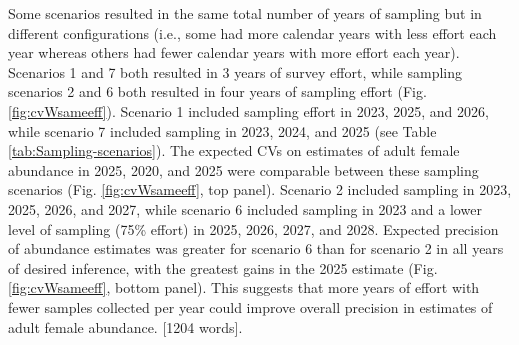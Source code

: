 Some scenarios resulted in the same total number of years of sampling
but in different configurations (i.e., some had more calendar years
with less effort each year whereas others had fewer calendar years
with more effort each year). Scenarios 1 and 7 both resulted in 3
years of survey effort, while sampling scenarios 2 and 6 both resulted
in four years of sampling effort (Fig. \ref{fig:cvWsameeff}). Scenario
1 included sampling effort in 2023, 2025, and 2026, while scenario
7 included sampling in 2023, 2024, and 2025 (see Table \ref{tab:Sampling-scenarios}).
The expected CVs on estimates of adult female abundance in 2025, 2020,
and 2025 were comparable between these sampling scenarios (Fig. \ref{fig:cvWsameeff},
top panel). Scenario 2 included sampling in 2023, 2025, 2026, and
2027, while scenario 6 included sampling in 2023 and a lower level
of sampling (75\% effort) in 2025, 2026, 2027, and 2028. Expected
precision of abundance estimates was greater for scenario 6 than for
scenario 2 in all years of desired inference, with the greatest gains
in the 2025 estimate (Fig. \ref{fig:cvWsameeff}, bottom panel). This
suggests that more years of effort with fewer samples collected per
year could improve overall precision in estimates of adult female
abundance. {[}1204 words{]}.
